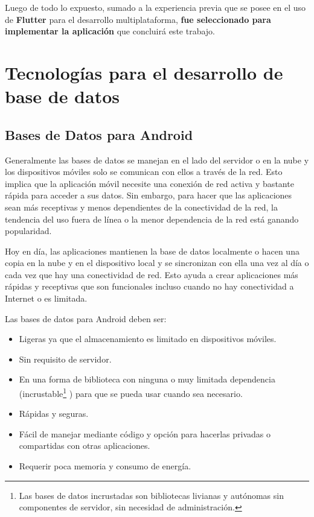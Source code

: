 Luego de todo lo expuesto, sumado a la experiencia previa que se posee en el uso de \textbf{Flutter} para el desarrollo multiplataforma,\textbf{ fue seleccionado para implementar la aplicación} que concluirá este trabajo.

\section{Tecnologías para el desarrollo de base de datos}\label{chapter:introduction}





\subsection{Bases de Datos para Android}\label{chapter:introduction}

Generalmente las bases de datos se manejan en el lado del servidor o en la nube y los dispositivos móviles solo se comunican con ellos a través de la red. Esto implica que la aplicación móvil necesite una conexión de red activa y bastante rápida para acceder a sus datos. Sin embargo, para hacer que las aplicaciones sean más receptivas y menos dependientes de la conectividad de la red, la tendencia del uso fuera de línea o la menor dependencia de la red está ganando popularidad.

Hoy en día, las aplicaciones mantienen la base de datos localmente o hacen una copia en la nube y en el dispositivo local y se sincronizan con ella una vez al día o cada vez que hay una conectividad de red. Esto ayuda a crear aplicaciones más rápidas y receptivas que son funcionales incluso cuando no hay conectividad a Internet o es limitada.

Las bases de datos para Android deben ser:
\begin{itemize}


\item	Ligeras ya que el almacenamiento es limitado en dispositivos móviles.
\item	Sin requisito de servidor.
\item	En una forma de biblioteca con ninguna o muy limitada dependencia (incrustable\footnote{Las bases de datos incrustadas son bibliotecas livianas y autónomas sin componentes de servidor, sin necesidad de administración.} ) para que se pueda usar cuando sea necesario.
\item	Rápidas y seguras.
\item	Fácil de manejar mediante código y opción para hacerlas privadas o compartidas con otras aplicaciones.
\item	Requerir poca memoria y consumo de energía.
\end{itemize}

